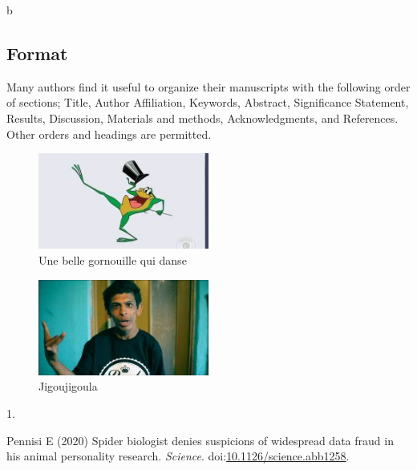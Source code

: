 \documentclass[9pt,twocolumn,twoside,]{pnas-new}
\newlength{\cslhangindent}
\newlength{\csllabelwidth}
\newlength{\cslentryspacingunit} %
\newenvironment{CSLReferences}[2] %
 {%
  \setlength{\parindent}{0pt}
  \ifodd #1
  \let\oldpar\par
  \def\par{\hangindent=\cslhangindent\oldpar}
  \fi
  \setlength{\parskip}{#2\cslentryspacingunit}
 }%
 {}
\newcommand{\CSLLeftMargin}[1]{\parbox[t]{\csllabelwidth}{#1}}
\newcommand{\CSLRightInline}[1]{\parbox[t]{\linewidth - \csllabelwidth}{#1}\break}
\begin{document}
b

\hypertarget{format}{%
\subsection*{Format}\label{format}}

Many authors find it useful to organize their manuscripts with the
following order of sections; Title, Author Affiliation, Keywords,
Abstract, Significance Statement, Results, Discussion, Materials and
methods, Acknowledgments, and References. Other orders and headings are
permitted.

\begin{figure}
\centering
\includegraphics[width=0.5\textwidth,height=0.4\textheight]{grenouille.jpg}
\caption{Une belle gornouille qui danse}
\end{figure}

\begin{figure}
\centering
\includegraphics[width=0.5\textwidth,height=0.4\textheight]{Istadbut.jpg}
\caption{Jigoujigoula}
\end{figure}

\showmatmethods
\showacknow
\pnasbreak

\hypertarget{refs}{}
\begin{CSLReferences}{0}{0}
\leavevmode{}%
\CSLLeftMargin{1. }
\CSLRightInline{Pennisi E (2020) Spider biologist denies suspicions of
widespread data fraud in his animal personality research.
\emph{Science}.
doi:\href{https://doi.org/10.1126/science.abb1258}{10.1126/science.abb1258}.}

\end{CSLReferences}



% 
\end{document}
